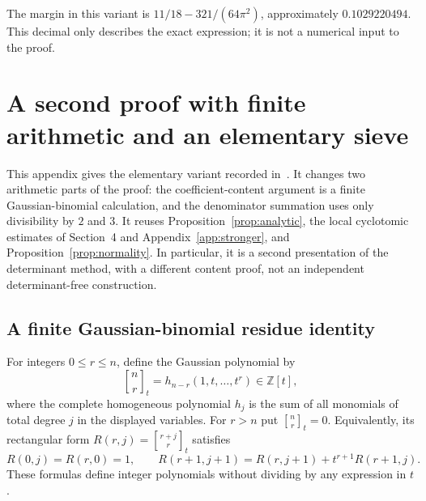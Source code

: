 \documentclass[11pt,letterpaper]{article}
\numberwithin{equation}{section}
\theoremstyle{remark}
\newcommand{\Z}{\mathbb Z}
\newcommand{\gaussbinom}[3]{\genfrac{[}{]}{0pt}{}{#1}{#2}_{#3}}
\begin{document}
The margin in this variant is $11/18-321/(64\pi^2)$, approximately $0.1029220494$. This decimal only describes the exact expression; it is not a numerical input to the proof.


\section{A second proof with finite arithmetic and an elementary sieve}\label{app:elementary}

This appendix gives the elementary variant recorded in~\cite{ElementaryRecord}. It changes two arithmetic parts of the proof: the coefficient-content argument is a finite Gaussian-binomial calculation, and the denominator summation uses only divisibility by $2$ and $3$. It reuses Proposition~\ref{prop:analytic}, the local cyclotomic estimates of Section~4 and Appendix~\ref{app:stronger}, and Proposition~\ref{prop:normality}. In particular, it is a second presentation of the determinant method, with a different content proof, not an independent determinant-free construction.

\subsection{A finite Gaussian-binomial residue identity}

For integers $0\le r\le n$, define the Gaussian polynomial by
\begin{equation}\label{eq:gaussian-definition}
 \gaussbinom{n}{r}{t}=h_{n-r}(1,t,\ldots,t^r)\in\Z[t],
\end{equation}
where the complete homogeneous polynomial $h_j$ is the sum of all monomials of total degree $j$ in the displayed variables. For $r>n$ put $\gaussbinom{n}{r}{t}=0$. Equivalently, its rectangular form $R(r,j)=\gaussbinom{r+j}{r}{t}$ satisfies
\begin{equation*}
 R(0,j)=R(r,0)=1,\qquad
 R(r+1,j+1)=R(r,j+1)+t^{r+1}R(r+1,j).
\end{equation*}
These formulas define integer polynomials without dividing by any expression in $t$.
\end{document}
